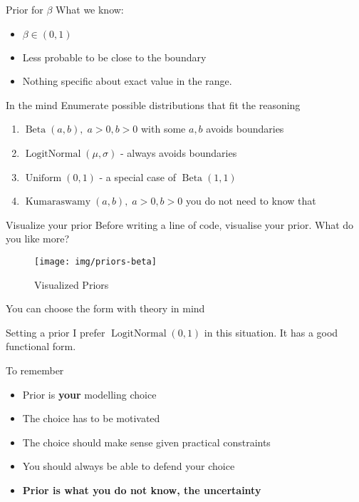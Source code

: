 \documentclass{beamer}
\begin{document}
\begin{frame}{Prior for $\beta$}
    What we know: 
    \begin{itemize}
        \item $\beta \in (0, 1)$
        \item Less probable to be close to the boundary
        \item Nothing specific about exact value in the range.
    \end{itemize}
\begin{block}{In the mind}
Enumerate possible distributions that fit the reasoning
\end{block}
\begin{enumerate}
    \item<2-> $\operatorname{Beta}(a, b),\; a>0, b > 0$ with some $a, b$ avoids boundaries
    \item<3-> $\operatorname{LogitNormal}(\mu, \sigma)$ - always avoids boundaries
    \item<4-> $\operatorname{Uniform}(0, 1)$ - a special case of $\operatorname{Beta}(1, 1)$
    \item<5-> $\operatorname{Kumaraswamy}(a, b),\; a>0, b > 0$ you do not need to know that
\end{enumerate}
\end{frame}
\begin{frame}{Visualize your prior}
Before writing a line of code, visualise your prior. What do you like more?
\begin{figure}
    \centering
    \texttt{[image: img/priors-beta]}
    \caption{Visualized Priors}
\end{figure}
You can choose the form with theory in mind
\end{frame}
\begin{frame}{Setting a prior}
    I prefer $\operatorname{LogitNormal}(0, 1)$ in this situation. It has a good functional form.
    \begin{block}{To remember}
    \begin{itemize}
        \item Prior is \textbf{your} modelling choice
        \item The choice has to be motivated
        \item The choice should make sense given practical constraints
        \item You should always be able to defend your choice
        \item \textbf{Prior is what you do not know, the uncertainty}
    \end{itemize}
    \end{block}
\end{frame}
\end{document}
